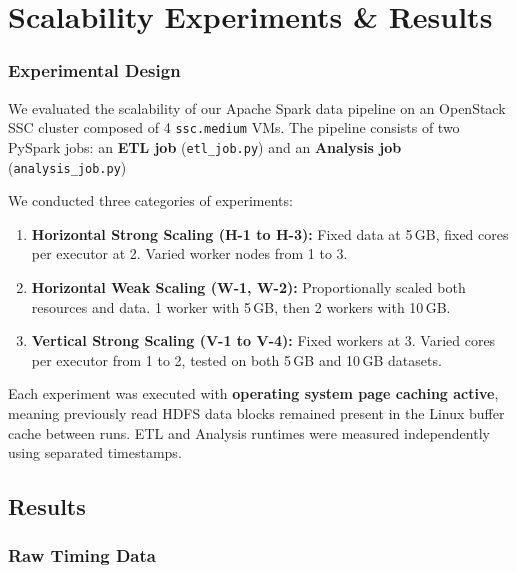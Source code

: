 \section{Scalability Experiments \& Results}
\label{sec:scalability}
\subsubsection{Experimental Design}
\label{sec:design}
We evaluated the scalability of our Apache Spark data pipeline on an OpenStack SSC cluster composed of 4 \texttt{ssc.medium} VMs. The pipeline consists of two PySpark jobs: an \textbf{ETL job} (\texttt{etl\_job.py}) and an \textbf{Analysis job} (\texttt{analysis\_job.py})

We conducted three categories of experiments:

\begin{enumerate}
    \item \textbf{Horizontal Strong Scaling (H-1 to H-3):} Fixed data at 5\,GB, fixed cores per executor at 2. Varied worker nodes from 1 to 3.
    \item \textbf{Horizontal Weak Scaling (W-1, W-2):} Proportionally scaled both resources and data. 1 worker with 5\,GB, then 2 workers with 10\,GB.
    \item \textbf{Vertical Strong Scaling (V-1 to V-4):} Fixed workers at 3. Varied cores per executor from 1 to 2, tested on both 5\,GB and 10\,GB datasets.
\end{enumerate}

Each experiment was executed with \textbf{operating system page caching active}, meaning previously read HDFS data blocks remained present in the Linux buffer cache between runs. ETL and Analysis runtimes were measured independently using separated timestamps.

\subsection{Results}


\subsubsection{Raw Timing Data}

